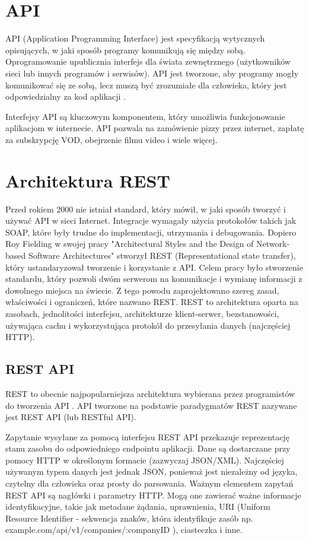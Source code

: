 \section{API}
	API (Application Programming Interface) jest specyfikacją wytycznych opisujących, w jaki sposób programy komunikują się między sobą. Oprogramowanie upublicznia interfejs dla świata zewnętrznego (użytkowników sieci lub innych programów i serwisów). API jest tworzone, aby programy mogły komunikować się ze sobą, lecz muszą być zrozumiałe dla człowieka, który jest odpowiedzialny za kod aplikacji \cite{DesigningWebAPIs}.
	
	Interfejsy API są kluczowym komponentem, który umożliwia funkcjonowanie aplikacjom w internecie. API pozwala na zamówienie pizzy przez internet, zapłatę za subskrypcję VOD, obejrzenie filmu video i wiele więcej.
	

\section{Architektura REST}
	Przed rokiem 2000 nie istniał standard, który mówił, w jaki sposób tworzyć i używać API w sieci Internet. Integracje wymagały użycia protokołów takich jak SOAP, które były trudne do implementacji, utrzymania i debugowania. Dopiero Roy Fielding w swojej pracy "Architectural Styles and the Design of Network-based Software Architectures" \cite{ArchitecturalStyles} stworzył REST (Representational state transfer), który ustandaryzował tworzenie i korzystanie z API. Celem pracy było stworzenie standardu, który pozwoli dwóm serwerom na komunikacje i wymianę informacji z dowolnego miejsca na świecie. Z tego powodu zaprojektowano szereg zasad, właściwości i ograniczeń, które nazwano REST. REST to architektura oparta na zasobach, jednolitości interfejsu, architekturze klient-serwer, bezstanowości, używająca cachu i wykorzystująca protokół do przesyłania danych (najczęściej HTTP).
	
	\subsection{REST API}
		REST to obecnie najpopularniejsza architektura wybierana przez programistów do tworzenia API \cite{DesigningWebAPIs}. API tworzone na podstawie paradygmatów REST nazywane jest REST API (lub RESTful API).
		
		Zapytanie wysyłane za pomocą interfejsu REST API przekazuje reprezentację stanu zasobu do odpowiedniego endpointu aplikacji. Dane są dostarczane przy pomocy HTTP w określonym formacie (zazwyczaj JSON/XML). Najczęściej używanym typem danych jest jednak JSON, ponieważ jest niezależny od języka, czytelny dla człowieka oraz prosty do parsowania. Ważnym elementem zapytań REST API są nagłówki i parametry HTTP. Mogą one zawierać ważne informacje identyfikacyjne, takie jak metadane żądania, uprawnienia, URI (Uniform Resource Identifier - sekwencja znaków, która identyfikuje zasób np. example.com/api/v1/companies/:companyID \cite{RESTAPIDesignRulebook}), ciasteczka i inne.
	
